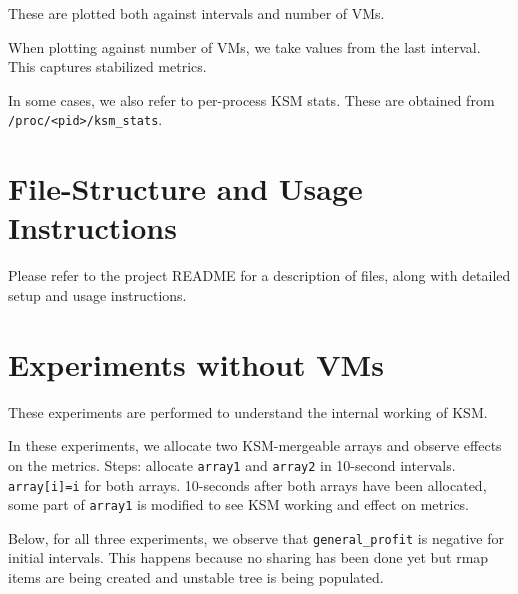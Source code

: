 \documentclass{article}
\begin{document}
These are plotted both against intervals and number of VMs.

When plotting against number of VMs, we take values from the last interval. This captures stabilized metrics.

In some cases, we also refer to per-process KSM stats. These are obtained from \texttt{/proc/<pid>/ksm\_stats}.

\section{File-Structure and Usage Instructions}

Please refer to the project README for a description of files, along with detailed setup and usage instructions.

\newpage

\section{Experiments without VMs}
\label{exp_no_vm}

These experiments are performed to understand the internal working of KSM.

In these experiments, we allocate two KSM-mergeable arrays and observe effects on the metrics. Steps: allocate \texttt{array1} and \texttt{array2} in 10-second intervals. \texttt{array[i]=i} for both arrays. 10-seconds after both arrays have been allocated, some part of \texttt{array1} is modified to see KSM working and effect on metrics.


Below, for all three experiments, we observe that \texttt{general\_profit} is negative for initial intervals. This happens because no sharing has been done yet but rmap items are being created and unstable tree is being populated.
\end{document}
